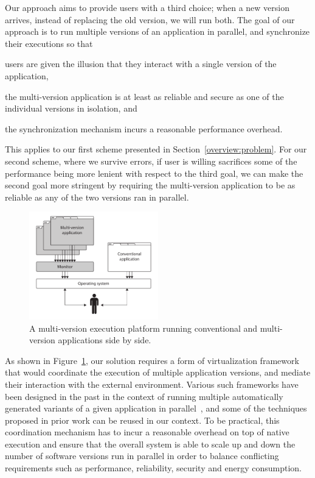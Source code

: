 Our approach aims to provide users with a third choice; when a new version
arrives, instead of replacing the old version, we will run both. The goal
of our approach is to run multiple versions of an application in parallel, and
synchronize their executions so that%
\begin{inparaenum}[(1)]
\item users are given the illusion that they interact with a single version of
  the application,
\item the multi-version application is at least as reliable and secure as one
  of the individual versions in isolation, and
\item the synchronization mechanism incurs a reasonable performance overhead.
\end{inparaenum}
This applies to our first scheme presented in Section~\ref{overview:problem}.
For our second scheme, where we survive errors, if user is willing sacrifices
some of the performance being more lenient with respect to the third goal, we
can make the second goal more stringent by requiring the multi-version
application to be as reliable as any of the two versions ran in parallel.

\begin{figure}[t]
  \begin{center}
    \includegraphics[width=0.5\textwidth]{multi-version/figures/platform}
    \caption{A multi-version execution platform running conventional and multi-version
      applications side by side.}
    \label{fig:mx-platform}
  \end{center}
\end{figure}

As shown in Figure~\ref{fig:mx-platform}, our solution requires a form of
virtualization framework that would coordinate the execution of multiple
application versions, and mediate their interaction with the external
environment. Various such frameworks have been designed in the past in the
context of running multiple automatically generated variants of a given
application in parallel~\cite{diehard06,cox2006,orchestra09}, and some of the
techniques proposed in prior work can be reused in our context.  To be
practical, this coordination mechanism has to incur a reasonable overhead on
top of native execution and ensure that the overall system is able to scale up
and down the number of software versions run in parallel in order to balance
conflicting requirements such as performance, reliability, security and energy
consumption.

